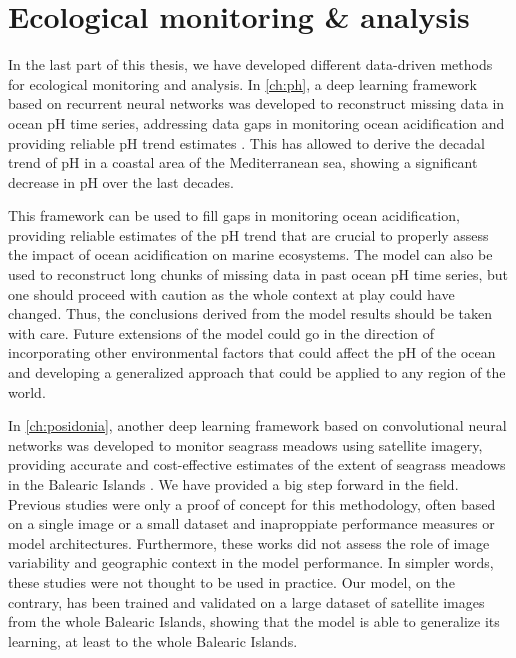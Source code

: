 \section{Ecological monitoring \& analysis}

In the last part of this thesis, we have developed different data-driven
methods for ecological monitoring and analysis. In \cref{ch:ph}, a deep
learning framework based on recurrent neural networks was developed to
reconstruct missing data in ocean pH time series, addressing data gaps in
monitoring ocean acidification and providing reliable pH trend estimates
\cite{Flecha2022}. This has allowed to derive the decadal trend of pH in a
coastal area of the Mediterranean sea, showing a significant decrease in pH
over the last decades.

This framework can be used to fill gaps in monitoring ocean acidification,
providing reliable estimates of the pH trend that are crucial to properly
assess the impact of ocean acidification on marine ecosystems. The model can
also be used to reconstruct long chunks of missing data in past ocean pH time
series, but one should proceed with caution as the whole context at play could
have changed. Thus, the conclusions derived from the model results should be
taken with care. Future extensions of the model could go in the direction of
incorporating other environmental factors that could affect the pH of the ocean
and developing a generalized approach that could be applied to any region of
the world.

In \cref{ch:posidonia}, another deep learning framework based on convolutional
neural networks was developed to monitor seagrass meadows using satellite
imagery, providing accurate and cost-effective estimates of the extent of
seagrass meadows in the Balearic Islands \cite{GimenezRomero2024_posi}. We have
provided a big step forward in the field. Previous studies were only a proof of
concept for this methodology, often based on a single image or a small dataset
and inaproppiate performance measures or model architectures. Furthermore,
these works did not assess the role of image variability and geographic context
in the model performance. In simpler words, these studies were not thought to
be used in practice. Our model, on the contrary, has been trained and validated
on a large dataset of satellite images from the whole Balearic Islands, showing
that the model is able to generalize its learning, at least to the whole
Balearic Islands.

